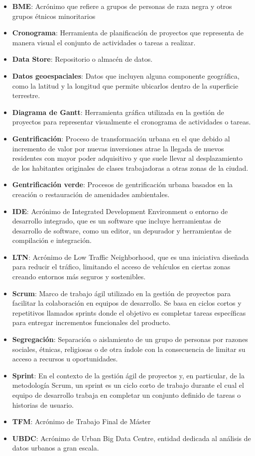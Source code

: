 \documentclass[12pt,a4paper,twoside]{book}
\begin{document}
\begin{itemize}
    \item \textbf{BME}: Acrónimo que refiere a grupos de personas de raza negra y otros grupos étnicos minoritarios
    \item \textbf{Cronograma}: Herramienta de planificación de proyectos que representa de manera visual el conjunto de actividades o tareas a realizar.
    \item \textbf{Data Store}: Repositorio o almacén de datos.
    \item \textbf{Datos geoespaciales}: Datos que incluyen alguna componente geográfica, como la latitud y la longitud que permite ubicarlos dentro de la superficie terrestre.
    \item \textbf{Diagrama de Gantt}: Herramienta gráfica utilizada en la gestión de proyectos para representar visualmente el cronograma de actividades o tareas.
    \item \textbf{Gentrificación}: Proceso de transformación urbana en el que debido al incremento de valor por nuevas inversiones atrae la llegada de nuevos residentes con mayor poder adquisitivo y que suele llevar al desplazamiento de los habitantes originales de clases trabajadoras a otras zonas de la ciudad.
    \item \textbf{Gentrificación verde}: Procesos de gentrificación urbana basados en la creación o restauración de amenidades ambientales.
    \item \textbf{IDE}: Acrónimo de Integrated Development Environment o entorno de desarrollo integrado, que es un software que incluye herramientas de desarrollo de software, como un editor, un depurador y herramientas de compilación e integración.
    \item \textbf{LTN}: Acrónimo de Low Traffic Neighborhood, que es una iniciativa diseñada para reducir el tráfico, limitando el acceso de vehículos en ciertas zonas creando entornos más seguros y sostenibles.
    \item \textbf{Scrum}: Marco de trabajo ágil utilizado en la gestión de proyectos para facilitar la colaboración en equipos de desarrollo. Se basa en ciclos cortos y repetitivos llamados sprints donde el objetivo es completar tareas específicas para entregar incrementos funcionales del producto.
    \item \textbf{Segregación}: Separación o aislamiento de un grupo de personas por razones sociales, étnicas, religiosas o de otra índole con la consecuencia de limitar su acceso a recursos u oportunidades. 
    \item \textbf{Sprint}: En el contexto de la gestión ágil de proyectos y, en particular, de la metodología Scrum, un sprint es un ciclo corto de trabajo durante el cual el equipo de desarrollo trabaja en completar un conjunto definido de tareas o historias de usuario.
    \item \textbf{TFM}: Acrónimo de Trabajo Final de Máster
    \item \textbf{UBDC}: Acrónimo de Urban Big Data Centre, entidad dedicada al análisis de datos urbanos a gran escala.
\end{itemize}

%



\end{document}
